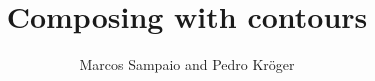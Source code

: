 \documentclass[12pt]{article}
\begin{document}
\title{Composing with contours}
\author{Marcos Sampaio and Pedro Kröger}

\maketitle

\thispagestyle{empty}

\doublespacing


\singlespacing



\end{document}
